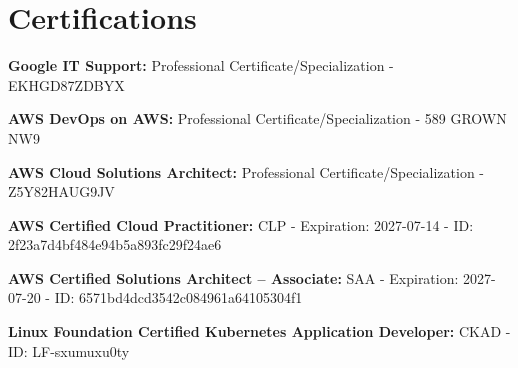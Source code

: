 \documentclass[letterpaper,11pt]{article}
\newcommand{\resumeSubHeadingListStart}{\begin{itemize}[leftmargin=0.15in, label={}]}
\newcommand{\resumeSubHeadingListEnd}{\end{itemize}}
\begin{document}
\section{Certifications}
  \vspace{2pt}
  \resumeSubHeadingListStart
    \small{\item{
        \textbf{Google IT Support:}{ Professional Certificate/Specialization - EKHGD87ZDBYX} \\ \vspace{3pt}

        \textbf{AWS DevOps on AWS:}{ Professional Certificate/Specialization - 589 GROWN NW9} \\ \vspace{3pt}
        
        \textbf{AWS Cloud Solutions Architect:}{ Professional Certificate/Specialization - Z5Y82HAUG9JV} \\ \vspace{3pt}
        
        \textbf{AWS Certified Cloud Practitioner:}{ CLP - Expiration: 2027-07-14 - ID: 2f23a7d4bf484e94b5a893fc29f24ae6} \\ \vspace{3pt}
        
        \textbf{AWS Certified Solutions Architect – Associate:}{ SAA - Expiration: 2027-07-20 - ID: 6571bd4dcd3542c084961a64105304f1} \\ \vspace{3pt}
        
        \textbf{Linux Foundation Certified Kubernetes Application Developer:}{ CKAD - ID: LF-sxumuxu0ty}
    }}
  \resumeSubHeadingListEnd




        
\end{document}
